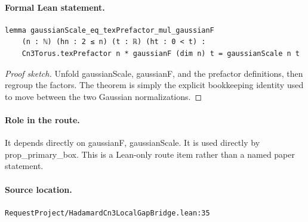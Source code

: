 \medskip
\paragraph{Formal Lean statement.}
\begin{verbatim}
lemma gaussianScale_eq_texPrefactor_mul_gaussianF
    (n : ℕ) (hn : 2 ≤ n) (t : ℝ) (ht : 0 < t) :
    Cn3Torus.texPrefactor n * gaussianF (dim n) t = gaussianScale n t
\end{verbatim}
\begin{proof}[Proof sketch]
Unfold gaussianScale, gaussianF, and the prefactor definitions, then regroup the factors. The theorem is simply the explicit bookkeeping identity used to move between the two Gaussian normalizations.
\end{proof}
\paragraph{Role in the route.}
It depends directly on gaussianF, gaussianScale. It is used directly by prop\_primary\_box. This is a Lean-only route item rather than a named paper statement.
\paragraph{Source location.}
\texttt{RequestProject/HadamardCn3LocalGapBridge.lean:35}
\medskip
